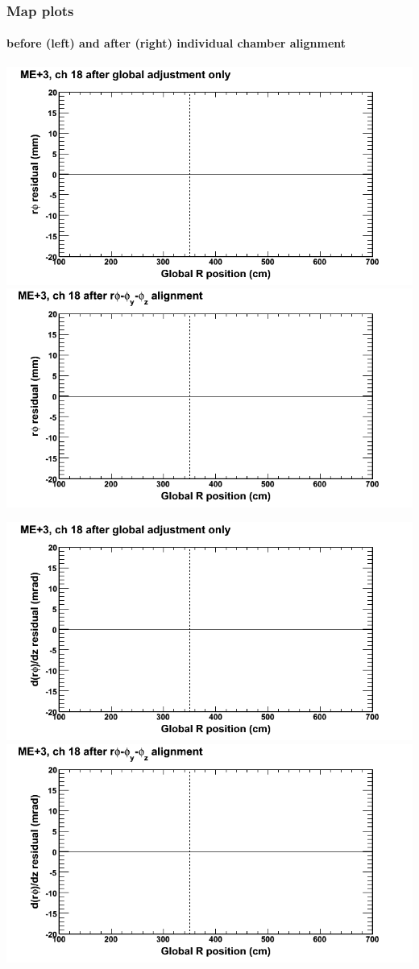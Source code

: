 \documentclass[compress]{beamer}
\begin{document}
\begin{frame}
\frametitle{Map plots}
\framesubtitle{before (left) and after (right) individual chamber alignment}
\includegraphics[width=0.5\linewidth]{ringmapplots_3dof/before_CSCvsr_mep3ch18_x.png} \includegraphics[width=0.5\linewidth]{ringmapplots_3dof/after_CSCvsr_mep3ch18_x.png}

\includegraphics[width=0.5\linewidth]{ringmapplots_3dof/before_CSCvsr_mep3ch18_dxdz.png} \includegraphics[width=0.5\linewidth]{ringmapplots_3dof/after_CSCvsr_mep3ch18_dxdz.png}
\end{frame}
\end{document}
